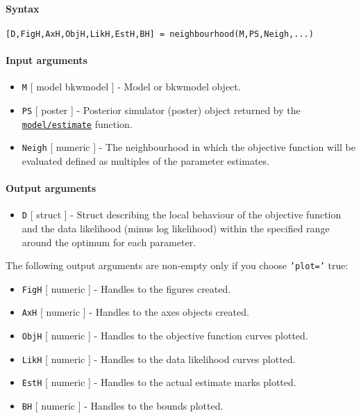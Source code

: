 


	\paragraph{Syntax}\label{syntax}

\begin{verbatim}
[D,FigH,AxH,ObjH,LikH,EstH,BH] = neighbourhood(M,PS,Neigh,...)
\end{verbatim}

\paragraph{Input arguments}\label{input-arguments}

\begin{itemize}
\item
  \texttt{M} {[} model \textbar{} bkwmodel {]} - Model or bkwmodel
  object.
\item
  \texttt{PS} {[} poster {]} - Posterior simulator (poster) object
  returned by the \href{model/estimate}{\texttt{model/estimate}}
  function.
\item
  \texttt{Neigh} {[} numeric {]} - The neighbourhood in which the
  objective function will be evaluated defined as multiples of the
  parameter estimates.
\end{itemize}

\paragraph{Output arguments}\label{output-arguments}

\begin{itemize}
\itemsep1pt\parskip0pt
\item
  \texttt{D} {[} struct {]} - Struct describing the local behaviour of
  the objective function and the data likelihood (minus log likelihood)
  within the specified range around the optimum for each parameter.
\end{itemize}

The following output arguments are non-empty only if you choose
\texttt{'plot='} true:

\begin{itemize}
\item
  \texttt{FigH} {[} numeric {]} - Handles to the figures created.
\item
  \texttt{AxH} {[} numeric {]} - Handles to the axes objects created.
\item
  \texttt{ObjH} {[} numeric {]} - Handles to the objective function
  curves plotted.
\item
  \texttt{LikH} {[} numeric {]} - Handles to the data likelihood curves
  plotted.
\item
  \texttt{EstH} {[} numeric {]} - Handles to the actual estimate marks
  plotted.
\item
  \texttt{BH} {[} numeric {]} - Handles to the bounds plotted.
\end{itemize}

